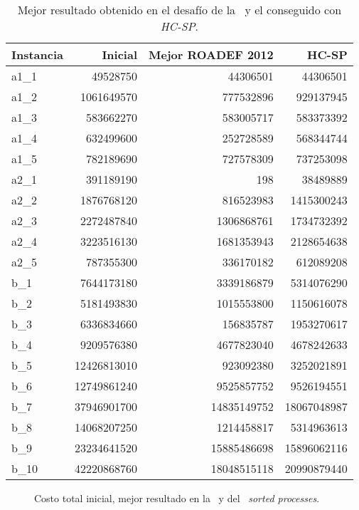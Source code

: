\documentclass[../informe2.tex]{subfiles}
\begin{document}
\begin{table}[h]
	\small
\centering
\begin{tabular}{@{}lrrr@{}}
\toprule
Instancia & Inicial & Mejor ROADEF 2012 & HC-SP \\ \midrule
a1\_1  & 49528750               & 44306501            & 44306501              \\
a1\_2  & 1061649570             & 777532896           & 929137945             \\
a1\_3  & 583662270              & 583005717           & 583373392             \\
a1\_4  & 632499600              & 252728589           & 568344744             \\
a1\_5  & 782189690              & 727578309           & 737253098             \\
a2\_1  & 391189190              & 198                 & 38489889              \\
a2\_2  & 1876768120             & 816523983           & 1415300243            \\
a2\_3  & 2272487840             & 1306868761          & 1734732392            \\
a2\_4  & 3223516130             & 1681353943          & 2128654638            \\
a2\_5  & 787355300              & 336170182           & 612089208             \\
b\_1   & 7644173180             & 3339186879          & 5314076290            \\
b\_2   & 5181493830             & 1015553800          & 1150616078            \\
b\_3   & 6336834660             & 156835787           & 1953270617            \\
b\_4   & 9209576380             & 4677823040          & 4678242633            \\
b\_5   & 12426813010            & 923092380           & 3252021891            \\
b\_6   & 12749861240            & 9525857752          & 9526194551            \\
b\_7   & 37946901700            & 14835149752         & 18067048987           \\
b\_8   & 14068207250            & 1214458817          & 5314963613            \\
b\_9   & 23234641520            & 15885486698         & 15896062116           \\
b\_10  & 42220868760            & 18048515118         & 20990879440           \\ \bottomrule
\end{tabular}
\caption{\small Mejor resultado obtenido en el desafío de la \roadef\ y el conseguido con \textit{HC-SP}.}\label{tabla:comparative-with-best-roadef}
\end{table}
\begin{figure}[h]
	\caption{\small Costo total inicial, mejor resultado en la \roadef\ y del \hillc\ \textit{sorted processes}.}\label{fig:comparativa-hc-best-challenge}
\end{figure}
\clearpage
\end{document}
